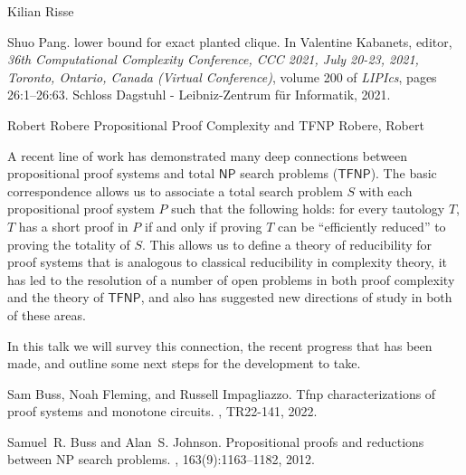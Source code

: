 \documentclass[report]{owrart}
\begin{document}
\begin{report}
\begin{talk}{Kilian Risse}
\begin{thebibliography}{99}
      Shuo Pang.
       lower bound for exact planted clique.
      \newblock In Valentine Kabanets, editor, {\em 36th Computational Complexity
        Conference, {CCC} 2021, July 20-23, 2021, Toronto, Ontario, Canada (Virtual
        Conference)}, volume 200 of {\em LIPIcs}, pages 26:1--26:63. Schloss Dagstuhl
        - Leibniz-Zentrum f{\"{u}}r Informatik, 2021.
    
    
    \end{thebibliography}
    
    \end{talk}
    

\begin{talk}{Robert Robere}
  {Propositional Proof Complexity and TFNP}
  {Robere, Robert}

\noindent
A recent line of work \cite{BussJ12, Goos2018, Goos22b, Goos22a, Buss22, DavisRobere23, Li24, Hubacek24} has demonstrated many deep connections between propositional proof systems and total $\mathsf{NP}$ search problems ($\mathsf{TFNP}$). The basic correspondence allows us to associate a total search problem $S$ with each propositional proof system $P$ such that the following holds: for every tautology $T$, $T$ has a short proof in $P$ if and only if proving $T$ can be “efficiently reduced” to proving the totality of $S$. This allows us to define a theory of reducibility for proof systems that is analogous to classical reducibility in complexity theory, it has led to the resolution of a number of open problems in both proof complexity and the theory of $\mathsf{TFNP}$, and also has suggested new directions of study in both of these areas. 

In this talk we will survey this connection, the recent progress that has been made, and outline some next steps for the development to take.

\begin{thebibliography}{99}
Sam Buss, Noah Fleming, and Russell Impagliazzo.
\newblock Tfnp characterizations of proof systems and monotone circuits.
, {TR22-141}, 2022.

Samuel~R. Buss and Alan~S. Johnson.
\newblock Propositional proofs and reductions between {NP} search problems.
, 163(9):1163--1182, 2012.


\end{thebibliography}
\end{talk}
\end{report}
\end{document}
